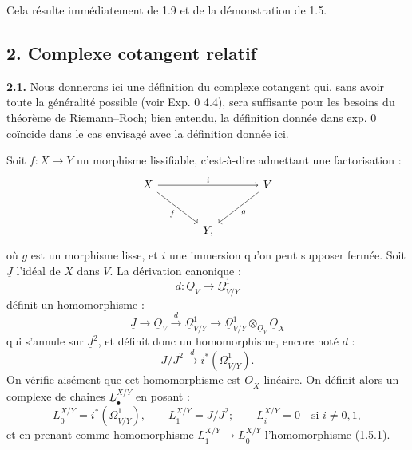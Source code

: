

Cela résulte immédiatement de 1.9 et de la démonstration de 1.5.

\subsection*{2. Complexe cotangent relatif}

\textbf{2.1.} Nous donnerons ici une définition du complexe cotangent qui, sans avoir toute la généralité possible (voir Exp. 0 4.4), sera suffisante pour les besoins du théorème de Riemann--Roch; bien entendu, la définition donnée dans exp. 0 coïncide dans le cas envisagé avec la définition donnée ici.

Soit $f:X\to Y$ un morphisme lissifiable, c'est-à-dire admettant une factorisation :
\[
\begin{tikzcd}[column sep=large,row sep=large]
X \arrow[rr,"i"] \arrow[dr,"f"'] && V \arrow[dl,"g"]\\
& Y, &
\end{tikzcd}
\]
où $g$ est un morphisme lisse, et $i$ une immersion qu'on peut supposer fermée. Soit $\underline{J}$ l'idéal de $X$ dans $V$. La dérivation canonique :
\[
d:\underline{O}_V\longrightarrow\underline{\Omega}^1_{V/Y}
\]
définit un homomorphisme :
\[
\underline{J}\longrightarrow\underline{O}_V\xrightarrow{d}\underline{\Omega}^1_{V/Y}\longrightarrow
\underline{\Omega}^1_{V/Y}\otimes_{\underline{O}_V}\underline{O}_X
\]
qui s'annule sur $\underline{J}^2$, et définit donc un homomorphisme, encore noté $d$ :
\begin{equation}\tag{2.1.1}
\underline{J}/\underline{J}^2\xrightarrow{d} i^*(\underline{\Omega}^1_{V/Y}).
\end{equation}
On vérifie aisément que cet homomorphisme est $\underline{O}_X$-linéaire. On définit alors un complexe de chaines $\underline{L}^{X/Y}_\bullet$ en posant :
\[
\underline{L}^{X/Y}_0=i^*(\underline{\Omega}^1_{V/Y}),\qquad
\underline{L}^{X/Y}_1=\underline{J}/\underline{J}^2;
\qquad
\underline{L}^{X/Y}_i=0\quad\text{si }i\neq0,1,
\]
et en prenant comme homomorphisme $\underline{L}^{X/Y}_1\to \underline{L}^{X/Y}_0$ l'homomorphisme (1.5.1).

